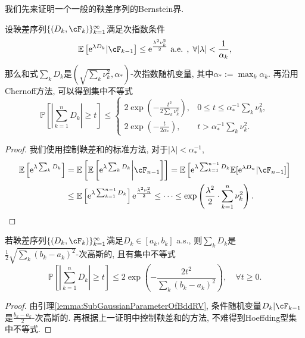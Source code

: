 我们先来证明一个一般的鞅差序列的Bernstein界. 
\begin{lemma}[Azuma]
	设鞅差序列$\{(D_k, \cF_k)\}_{k=1}^{\infty}$满足次指数条件
	\begin{equation*}
		\mathbb{E}\left[ \mathrm{e}^{\lambda D_k} | \cF_{k-1} \right] 
		\leq \mathrm{e}^{\frac{\lambda^2 \nu_k^2}{2}} \text{ a.e. },\; \forall |\lambda| < \frac{1}{\alpha_k}, 
	\end{equation*}
	那么和式$\sum_k D_k$是$\left( \sqrt{\sum_k \nu_k^2}, \alpha_* \right)$-次指数随机变量, 其中$\alpha_* := \max_k \alpha_k$.  
	再沿用Chernoff方法, 可以得到集中不等式
	\begin{equation*}
		\mathbb{P} \left[ \left| \sum_{k=1}^n D_k \right| \geq t \right] \leq 
		\begin{cases}
			2 \exp\left( -\frac{t^2}{2 \sum_k \nu_k^2} \right), & 0 \leq t \leq \alpha_*^{-1} \sum_k \nu_k^2, \\
			2 \exp\left(- \frac{t}{2 \alpha_*}\right), & t > \alpha_*^{-1} \sum_k \nu_k^2.
		\end{cases}
	\end{equation*}
\end{lemma}
\begin{proof}
	我们使用控制鞅差和的标准方法, 对于$|\lambda| < \alpha_*^{-1}$, 
	\begin{align*}
		\mathbb{E}\left[ \mathrm{e}^{\lambda \sum_k D_k} \right]
		&= \mathbb{E}\left[ \mathbb{E}\left[ \mathrm{e}^{\lambda \sum_k D_k} \bigg| \cF_{n-1} \right] \right] 
		= \mathbb{E}\left[ \mathrm{e}^{\lambda \sum_{k=1}^{n-1} D_k} \mathbb{E}[\mathrm{e}^{\lambda D_n} | \cF_{n-1}] \right] \\
		&\leq \mathbb{E}\left[ \mathrm{e}^{\lambda \sum_{k=1}^{n-1} D_k} \right]  \mathrm{e}^{\frac{\lambda^2 \nu_n^2}{2}} 
		\leq \dots
		\leq \exp\left(\frac{\lambda^2}{2} \cdot  \sum_{k=1}^n \nu_k^2 \right).
	\end{align*}
\end{proof} 

\begin{theorem}\label{thm:Azuma–Hoeffding}
	若鞅差序列$\{(D_k, \cF_k)\}_{k=1}^{\infty}$满足$D_k \in [a_k, b_k]$ a.s., 则$\sum_k D_k$是$\frac{1}{2}\sqrt{\sum_k (b_k - a_k)^2}$-次高斯的, 且有集中不等式
	\begin{equation*}
		\mathbb{P} \left[ \left| \sum_{k=1}^n D_k \right| \geq t \right]
		\leq 2 \exp \left(- \frac{2 t^2}{\sum_k (b_k - a_k)^2} \right), 
		\quad \forall t \geq 0. 
	\end{equation*}	
\end{theorem}
\begin{proof}
	由引理\ref{lemma:SubGaussianParameterOfBddRV}, 条件随机变量$D_k|\cF_{k-1}$是$\frac{b_k - a_k}{2}$-次高斯的. 
	再根据上一证明中控制鞅差和的方法, 不难得到Hoeffding型集中不等式. 
\end{proof}

